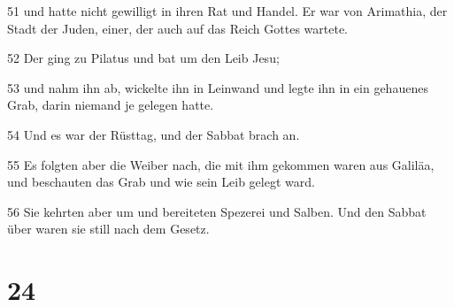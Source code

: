 \par 51 und hatte nicht gewilligt in ihren Rat und Handel. Er war von Arimathia, der Stadt der Juden, einer, der auch auf das Reich Gottes wartete.
\par 52 Der ging zu Pilatus und bat um den Leib Jesu;
\par 53 und nahm ihn ab, wickelte ihn in Leinwand und legte ihn in ein gehauenes Grab, darin niemand je gelegen hatte.
\par 54 Und es war der Rüsttag, und der Sabbat brach an.
\par 55 Es folgten aber die Weiber nach, die mit ihm gekommen waren aus Galiläa, und beschauten das Grab und wie sein Leib gelegt ward.
\par 56 Sie kehrten aber um und bereiteten Spezerei und Salben. Und den Sabbat über waren sie still nach dem Gesetz.

\chapter{24}

